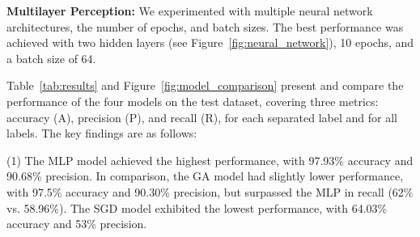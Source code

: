 \documentclass[runningheads]{llncs}
\begin{document}
{%
\textbf{Multilayer Perception: }
We experimented with multiple neural network architectures, the number of epochs, and batch sizes. The best performance was achieved with two hidden layers (see Figure~\ref{fig:neural_network}), 10 epochs, and a batch size of 64.


Table~\ref{tab:results} and Figure~\ref{fig:model_comparison} present and compare the performance of the four models on the test dataset, covering three metrics: accuracy (A), precision (P), and recall (R), for each separated label and for all labels. The key findings are as follows: %


(1) The MLP model achieved the highest performance, with 97.93\% accuracy and 90.68\% precision. In comparison, the GA model had slightly lower performance, with 97.5\% accuracy and 90.30\% precision, but surpassed the MLP in recall (62\% vs. 58.96\%). The SGD model exhibited the lowest performance, with 64.03\% accuracy and 53\% precision.

}
\end{document}
